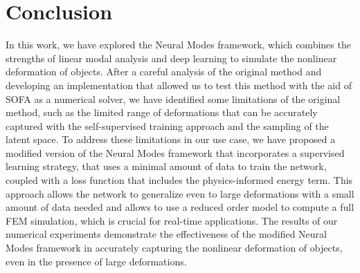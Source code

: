 \documentclass[11pt,a4paper]{article}
\numberwithin{equation}{section}
\begin{document}
















\section{Conclusion}
\label{sec:conclusion}
In this work, we have explored the Neural Modes framework, which combines the strengths of linear modal analysis and deep learning to simulate the nonlinear deformation of objects. After a careful analysis of the original method and developing an implementation that allowed us to test this method with the aid of SOFA as a numerical solver, we have identified some limitations of the original method, such as the limited range of deformations that can be accurately captured with the self-supervised training approach and the sampling of the latent space. To address these limitations in our use case, we have proposed a modified version of the Neural Modes framework that incorporates a supervised learning strategy, that uses a minimal amount of data to train the network, coupled with a loss function that includes the physics-informed energy term. This approach allows the network to generalize even to large deformations with a small amount of data needed and allows to use a reduced order model to compute a full FEM simulation, which is crucial for real-time applications. The results of our numerical experiments demonstrate the effectiveness of the modified Neural Modes framework in accurately capturing the nonlinear deformation of objects, even in the presence of large deformations. 
\end{document}
